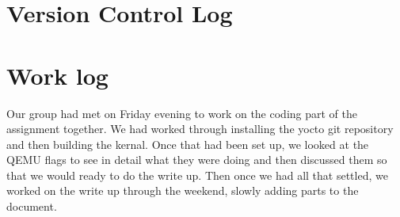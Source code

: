 \documentclass[10pt, onecolumn, letterpaper, draftclsnofoot]{IEEEtran}
\begin{document}
\section{Version Control Log}


\section{Work log}
Our group had met on Friday evening to work on the coding part of the assignment 
together. We had worked through installing the yocto git repository and then building 
the kernal. Once that had been set up, we looked at the QEMU flags to see in detail 
what they were doing and then discussed them so that we would ready to do the write up. 
Then once we had all that settled, we worked on the write up through the weekend,
slowly adding parts to the document. 
\end{document}
